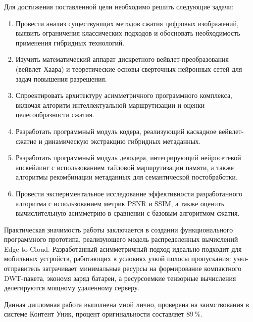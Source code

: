 Для достижения поставленной цели необходимо решить следующие задачи:
\begin{enumerate}
    \item Провести анализ существующих методов сжатия цифровых изображений, выявить ограничения классических подходов и обосновать необходимость применения гибридных технологий.
    \item Изучить математический аппарат дискретного вейвлет-преобразования (вейвлет Хаара) и теоретические основы сверточных нейронных сетей для задач повышения разрешения.
    \item Спроектировать архитектуру асимметричного программного комплекса, включая алгоритм интеллектуальной маршрутизации и оценки целесообразности сжатия.
    \item Разработать программный модуль кодера, реализующий каскадное вейвлет-сжатие и динамическую экстракцию гибридных метаданных.
    \item Разработать программный модуль декодера, интегрирующий нейросетевой апскейлинг с использованием тайловой маршрутизации памяти, а также алгоритмы рекомбинации метаданных для семантической постобработки.
    \item Провести экспериментальное исследование эффективности разработанного алгоритма с использованием метрик PSNR и SSIM, а также оценить вычислительную асимметрию в сравнении с базовым алгоритмом сжатия.
\end{enumerate}

Практическая значимость работы заключается в создании функционального программного прототипа, реализующего модель распределенных вычислений Edge-to-Cloud. Разработанный асимметричный подход идеально подходит для мобильных устройств, работающих в условиях узкой полосы пропускания: узел-отправитель затрачивает минимальные ресурсы на формирование компактного DWT-пакета, экономя заряд батареи, а ресурсоемкие тензорные вычисления делегируются мощному удаленному серверу.

Данная дипломная работа выполнена мной лично, проверена на заимствования в системе Контент Уник, процент оригинальности составляет 89\,\%.